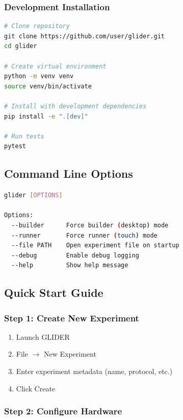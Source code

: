 \documentclass[11pt,a4paper]{article}
\begin{document}
\subsubsection{Development Installation}

\begin{lstlisting}[language=bash]
# Clone repository
git clone https://github.com/user/glider.git
cd glider

# Create virtual environment
python -m venv venv
source venv/bin/activate

# Install with development dependencies
pip install -e ".[dev]"

# Run tests
pytest
\end{lstlisting}

\subsection{Command Line Options}

\begin{lstlisting}[language=bash]
glider [OPTIONS]

Options:
  --builder      Force builder (desktop) mode
  --runner       Force runner (touch) mode
  --file PATH    Open experiment file on startup
  --debug        Enable debug logging
  --help         Show help message
\end{lstlisting}

\subsection{Quick Start Guide}

\subsubsection{Step 1: Create New Experiment}

\begin{enumerate}    \item Launch GLIDER
    \item File $\rightarrow$ New Experiment
    \item Enter experiment metadata (name, protocol, etc.)
    \item Click Create
\end{enumerate}

\subsubsection{Step 2: Configure Hardware}
\end{document}

